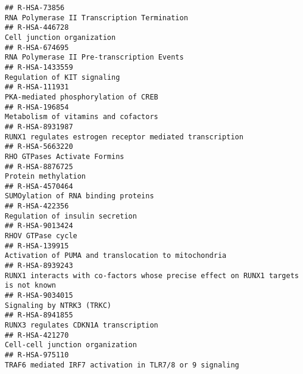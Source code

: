 \documentclass[
]{article}
\begin{document}
\begin{verbatim}
## R-HSA-73856                                                                                            RNA Polymerase II Transcription Termination
## R-HSA-446728                                                                                                            Cell junction organization
## R-HSA-674695                                                                                            RNA Polymerase II Pre-transcription Events
## R-HSA-1433559                                                                                                          Regulation of KIT signaling
## R-HSA-111931                                                                                                  PKA-mediated phosphorylation of CREB
## R-HSA-196854                                                                                                  Metabolism of vitamins and cofactors
## R-HSA-8931987                                                                             RUNX1 regulates estrogen receptor mediated transcription
## R-HSA-5663220                                                                                                         RHO GTPases Activate Formins
## R-HSA-8876725                                                                                                                  Protein methylation
## R-HSA-4570464                                                                                                  SUMOylation of RNA binding proteins
## R-HSA-422356                                                                                                       Regulation of insulin secretion
## R-HSA-9013424                                                                                                                    RHOV GTPase cycle
## R-HSA-139915                                                                                  Activation of PUMA and translocation to mitochondria
## R-HSA-8939243                                                   RUNX1 interacts with co-factors whose precise effect on RUNX1 targets is not known
## R-HSA-9034015                                                                                                            Signaling by NTRK3 (TRKC)
## R-HSA-8941855                                                                                                 RUNX3 regulates CDKN1A transcription
## R-HSA-421270                                                                                                       Cell-cell junction organization
## R-HSA-975110                                                                               TRAF6 mediated IRF7 activation in TLR7/8 or 9 signaling

\end{verbatim}
\end{document}

